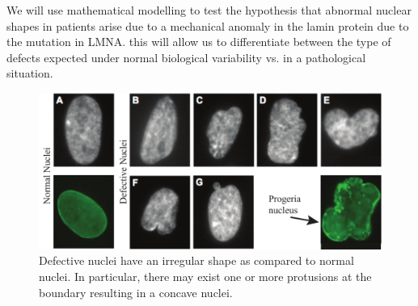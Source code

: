 We will use mathematical modelling to test the hypothesis that abnormal nuclear shapes in patients arise due to a mechanical anomaly in the lamin protein due to the mutation in LMNA. this will allow us to differentiate between the type of defects expected under normal biological variability vs. in a pathological situation. 

\begin{figure}[h]
\centering
\captionsetup{width=.9\linewidth}
\includegraphics[width=6in]{Project3/figs/blebnuclei}
\caption{Defective nuclei have an irregular shape as compared to normal nuclei. In particular, there may exist one or more protusions at the boundary resulting in a concave nuclei.}
\label{fig::blebnuclei}
\end{figure}
